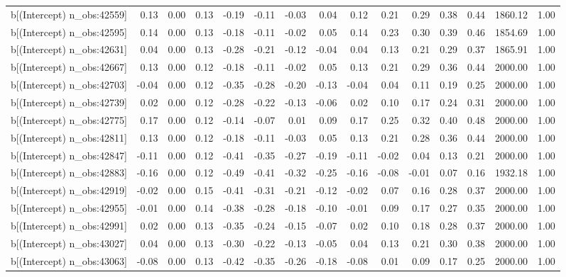 \begin{table}[ht]
\begin{tabular}{rrrrrrrrrrrrrrr}
  b[(Intercept) n\_obs:42559] & 0.13 & 0.00 & 0.13 & -0.19 & -0.11 & -0.03 & 0.04 & 0.12 & 0.21 & 0.29 & 0.38 & 0.44 & 1860.12 & 1.00 \\ 
  b[(Intercept) n\_obs:42595] & 0.14 & 0.00 & 0.13 & -0.18 & -0.11 & -0.02 & 0.05 & 0.14 & 0.23 & 0.30 & 0.39 & 0.46 & 1854.69 & 1.00 \\ 
  b[(Intercept) n\_obs:42631] & 0.04 & 0.00 & 0.13 & -0.28 & -0.21 & -0.12 & -0.04 & 0.04 & 0.13 & 0.21 & 0.29 & 0.37 & 1865.91 & 1.00 \\ 
  b[(Intercept) n\_obs:42667] & 0.13 & 0.00 & 0.12 & -0.18 & -0.11 & -0.02 & 0.05 & 0.13 & 0.21 & 0.29 & 0.36 & 0.44 & 2000.00 & 1.00 \\ 
  b[(Intercept) n\_obs:42703] & -0.04 & 0.00 & 0.12 & -0.35 & -0.28 & -0.20 & -0.13 & -0.04 & 0.04 & 0.11 & 0.19 & 0.25 & 2000.00 & 1.00 \\ 
  b[(Intercept) n\_obs:42739] & 0.02 & 0.00 & 0.12 & -0.28 & -0.22 & -0.13 & -0.06 & 0.02 & 0.10 & 0.17 & 0.24 & 0.31 & 2000.00 & 1.00 \\ 
  b[(Intercept) n\_obs:42775] & 0.17 & 0.00 & 0.12 & -0.14 & -0.07 & 0.01 & 0.09 & 0.17 & 0.25 & 0.32 & 0.40 & 0.48 & 2000.00 & 1.00 \\ 
  b[(Intercept) n\_obs:42811] & 0.13 & 0.00 & 0.12 & -0.18 & -0.11 & -0.03 & 0.05 & 0.13 & 0.21 & 0.28 & 0.36 & 0.44 & 2000.00 & 1.00 \\ 
  b[(Intercept) n\_obs:42847] & -0.11 & 0.00 & 0.12 & -0.41 & -0.35 & -0.27 & -0.19 & -0.11 & -0.02 & 0.04 & 0.13 & 0.21 & 2000.00 & 1.00 \\ 
  b[(Intercept) n\_obs:42883] & -0.16 & 0.00 & 0.12 & -0.49 & -0.41 & -0.32 & -0.25 & -0.16 & -0.08 & -0.01 & 0.07 & 0.16 & 1932.18 & 1.00 \\ 
  b[(Intercept) n\_obs:42919] & -0.02 & 0.00 & 0.15 & -0.41 & -0.31 & -0.21 & -0.12 & -0.02 & 0.07 & 0.16 & 0.28 & 0.37 & 2000.00 & 1.00 \\ 
  b[(Intercept) n\_obs:42955] & -0.01 & 0.00 & 0.14 & -0.38 & -0.28 & -0.18 & -0.10 & -0.01 & 0.09 & 0.17 & 0.27 & 0.35 & 2000.00 & 1.00 \\ 
  b[(Intercept) n\_obs:42991] & 0.02 & 0.00 & 0.13 & -0.35 & -0.24 & -0.15 & -0.07 & 0.02 & 0.10 & 0.18 & 0.28 & 0.37 & 2000.00 & 1.00 \\ 
  b[(Intercept) n\_obs:43027] & 0.04 & 0.00 & 0.13 & -0.30 & -0.22 & -0.13 & -0.05 & 0.04 & 0.13 & 0.21 & 0.30 & 0.38 & 2000.00 & 1.00 \\ 
  b[(Intercept) n\_obs:43063] & -0.08 & 0.00 & 0.13 & -0.42 & -0.35 & -0.26 & -0.18 & -0.08 & 0.01 & 0.09 & 0.17 & 0.25 & 2000.00 & 1.00 \\ 

\end{tabular}
\end{table}
